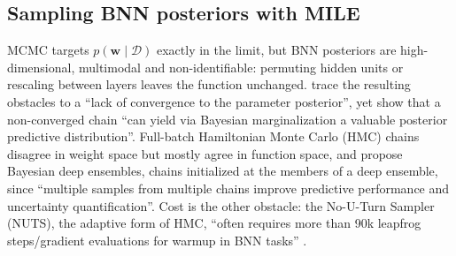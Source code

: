 \documentclass[11pt]{article}
\begin{document}
\subsection{Sampling BNN posteriors with MILE}
\label{sec:bg_sampling}
\label{sec:mile}
MCMC targets $p(\mathbf w\mid\mathcal{D})$ exactly in the limit, but BNN posteriors are
high-dimensional, multimodal and non-identifiable: permuting hidden units or rescaling between layers leaves the
function unchanged. \citet{papamarkou2022challenges} trace the resulting obstacles to a ``lack of convergence to the
parameter posterior'', yet show that a non-converged chain ``can yield via Bayesian marginalization a valuable posterior
predictive distribution''. Full-batch Hamiltonian Monte Carlo (HMC) chains \citep{izmailov2021bnn} disagree in weight space but mostly agree in
function space, and \citet{sommer2024connecting} propose Bayesian deep ensembles, chains initialized at the members of a
deep ensemble, since ``multiple samples from multiple chains improve predictive performance and uncertainty
quantification''. Cost is the other obstacle: the No-U-Turn Sampler (NUTS),
the adaptive form of HMC, ``often requires more than 90k leapfrog steps/gradient evaluations for
warmup in BNN tasks'' \citep{sommer2025mile}.
\end{document}

